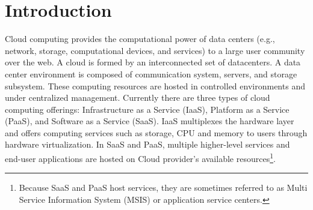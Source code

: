 \documentclass[11pt]{article}
\begin{document}
 \section{Introduction}   
 Cloud computing provides the computational power of data centers (e.g., network, storage, computational devices, and services) to a large user community over the web. 
	 A cloud is formed by an interconnected set of datacenters. 
	 A data center environment is composed of communication system, servers, and storage subsystem. These computing resources are hosted in controlled environments and under centralized management. 
		Currently there are three types of cloud computing offerings: Infrastructure as a Service (IaaS), Platform as a Service (PaaS), and Software as a Service (SaaS). IaaS multiplexes the hardware layer and offers computing services such as storage, CPU and memory to users through hardware virtualization. In SaaS and PaaS, multiple higher-level services and end-user applications are hosted on Cloud provider's available resources\footnote{Because SaaS and PaaS host services, they are sometimes referred to as Multi Service Information System (MSIS)\cite{li2011fast} or application service centers.}. %
			
\end{document}
